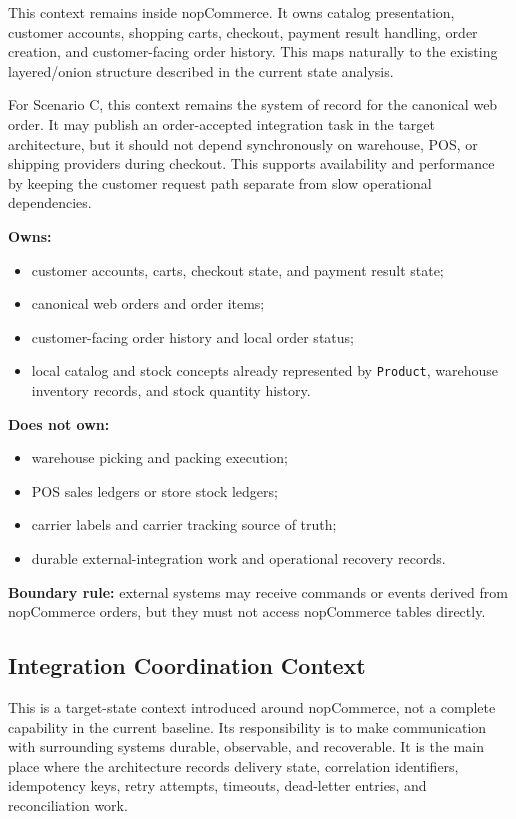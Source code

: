 This context remains inside nopCommerce. It owns catalog presentation, customer accounts,
shopping carts, checkout, payment result handling, order creation, and customer-facing order
history. This maps naturally to the existing layered/onion structure described in the current
state analysis.

For Scenario C, this context remains the system of record for the canonical web order. It may
publish an order-accepted integration task in the target architecture, but it should not depend
synchronously on warehouse, POS, or shipping providers during checkout. This supports
availability and performance by keeping the customer request path separate from slow
operational dependencies.

\textbf{Owns:}
\begin{itemize}
    \item customer accounts, carts, checkout state, and payment result state;
    \item canonical web orders and order items;
    \item customer-facing order history and local order status;
    \item local catalog and stock concepts already represented by \texttt{Product},
    warehouse inventory records, and stock quantity history.
\end{itemize}

\textbf{Does not own:}
\begin{itemize}
    \item warehouse picking and packing execution;
    \item POS sales ledgers or store stock ledgers;
    \item carrier labels and carrier tracking source of truth;
    \item durable external-integration work and operational recovery records.
\end{itemize}

\textbf{Boundary rule:} external systems may receive commands or events derived from
nopCommerce orders, but they must not access nopCommerce tables directly.

\subsection{Integration Coordination Context}

This is a target-state context introduced around nopCommerce, not a complete capability in the
current baseline. Its responsibility is to make communication with surrounding systems durable,
observable, and recoverable. It is the main place where the architecture records delivery state,
correlation identifiers, idempotency keys, retry attempts, timeouts, dead-letter entries, and
reconciliation work.

